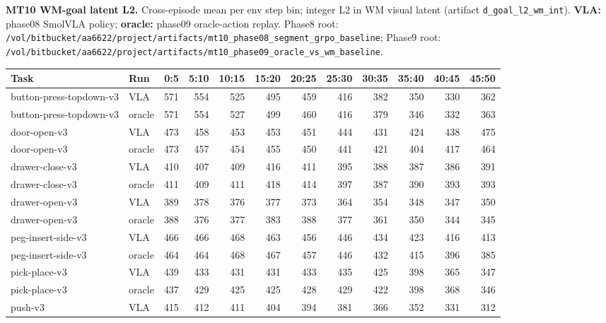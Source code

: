 
\noindent\textbf{MT10 WM-goal latent L2.} Cross-episode mean per env step bin; integer L2 in WM visual latent (artifact \texttt{d\_goal\_l2\_wm\_int}). \textbf{VLA:} phase08 SmolVLA policy; \textbf{oracle:} phase09 oracle-action replay.
Phase8 root: \texttt{/vol/bitbucket/aa6622/project/artifacts/mt10\_phase08\_segment\_grpo\_baseline}; Phase9 root: \texttt{/vol/bitbucket/aa6622/project/artifacts/mt10\_phase09\_oracle\_vs\_wm\_baseline}.

\begin{center}
\begin{tabular}{llrrrrrrrrrr}
\hline
\textbf{Task} & \textbf{Run} & \textbf{0:5} & \textbf{5:10} & \textbf{10:15} & \textbf{15:20} & \textbf{20:25} & \textbf{25:30} & \textbf{30:35} & \textbf{35:40} & \textbf{40:45} & \textbf{45:50} \\
\hline
button-press-topdown-v3 & VLA & 571 & 554 & 525 & 495 & 459 & 416 & 382 & 350 & 330 & 362 \\
button-press-topdown-v3 & oracle & 571 & 554 & 527 & 499 & 460 & 416 & 379 & 346 & 332 & 363 \\
door-open-v3 & VLA & 473 & 458 & 453 & 453 & 451 & 444 & 431 & 424 & 438 & 475 \\
door-open-v3 & oracle & 473 & 457 & 454 & 455 & 450 & 441 & 421 & 404 & 417 & 464 \\
drawer-close-v3 & VLA & 410 & 407 & 409 & 416 & 411 & 395 & 388 & 387 & 386 & 391 \\
drawer-close-v3 & oracle & 411 & 409 & 411 & 418 & 414 & 397 & 387 & 390 & 393 & 393 \\
drawer-open-v3 & VLA & 389 & 378 & 376 & 377 & 373 & 364 & 354 & 348 & 347 & 350 \\
drawer-open-v3 & oracle & 388 & 376 & 377 & 383 & 388 & 377 & 361 & 350 & 344 & 345 \\
peg-insert-side-v3 & VLA & 466 & 466 & 468 & 463 & 456 & 446 & 434 & 423 & 416 & 413 \\
peg-insert-side-v3 & oracle & 464 & 464 & 468 & 467 & 457 & 446 & 432 & 415 & 396 & 385 \\
pick-place-v3 & VLA & 439 & 433 & 431 & 431 & 433 & 435 & 425 & 398 & 365 & 347 \\
pick-place-v3 & oracle & 437 & 429 & 425 & 425 & 428 & 429 & 422 & 398 & 368 & 346 \\
push-v3 & VLA & 415 & 412 & 411 & 404 & 394 & 381 & 366 & 352 & 331 & 312 \\

\end{tabular}
\end{center}
